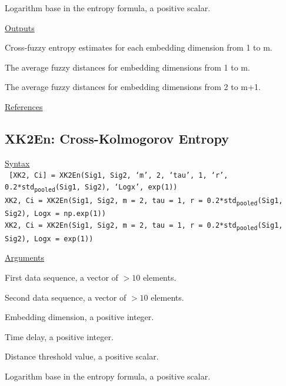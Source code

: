 \documentclass[12pt, a4paper, titlepage, openany]{book}
\begin{document}
\begin{description}[labelsep=1cm, labelwidth=2cm, nosep,style=multiline,leftmargin=3cm]
\item[\texttt{Logx}]	Logarithm base in the entropy formula, a positive scalar.
\end{description}

\noindent \ul{Outputs}
\begin{description}[labelsep=1cm, labelwidth=2cm, nosep]\footnotesize
\item[\texttt{XFuzz}]	Cross-fuzzy entropy estimates for each embedding dimension from 1 to m.
\item[\texttt{Ps1}]		The average fuzzy distances for embedding dimensions from 1 to m.
\item[\texttt{Ps2}]		The average fuzzy distances for embedding dimensions from 2 to m+1.
\end{description}

\noindent \ul{References}\hspace{1cm}
\cite{XFuzz1} \cite{Fuzz3}



\newpage
\subsection{\normalsize XK2En: \hspace{15mm}  Cross-Kolmogorov Entropy}\label{XK2En}
\noindent\ul{Syntax} \vspace{6mm} \\ \noindent \texttt{\footnotesize
[XK2, Ci] = XK2En(Sig1, Sig2, ‘m’, 2, ‘tau’, 1, ‘r’, 0.2*std\textsubscript{pooled}(Sig1, Sig2), ‘Logx’, exp(1)) \\
XK2, Ci  = XK2En(Sig1, Sig2, m = 2, tau = 1, r = 0.2*std\textsubscript{pooled}(Sig1, Sig2), Logx = np.exp(1)) \\
XK2, Ci  = XK2En(Sig1, Sig2, m = 2, tau = 1, r = 0.2*std\textsubscript{pooled}(Sig1, Sig2), Logx = exp(1))}

\noindent \ul{Arguments}
\begin{description}[labelsep=1cm, labelwidth=2cm, nosep, style=multiline,leftmargin=3cm]\footnotesize
\item[\texttt{Sig1}]	First data sequence, a vector of $>10$ elements.
\item[\texttt{Sig2}]	Second data sequence, a vector of $>10$ elements.
\item[\texttt{m}]		Embedding dimension, a positive integer.
\item[\texttt{tau}]		Time delay, a positive integer.
\item[\texttt{r}]		Distance threshold value, a positive scalar.
\item[\texttt{Logx}]	Logarithm base in the entropy formula, a positive scalar.
\end{description}
\end{document}

